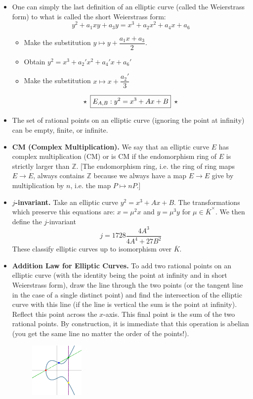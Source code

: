 \documentclass[11pt,letterpaper]{article}
\begin{document}
\begin{itemize}
\item One can simply the last definition of an elliptic curve (called the Weierstrass form) to what is called the short Weierstrass form:
	\[
	y^2 + a_1 xy + a_3y = x^3 + a_2 x^2 + a_4 x + a_6
	\]  
	\begin{itemize}
	\item Make the substitution $y \mapsto y + \dfrac{a_1 x+a_3}{2}$.
	\item Obtain $y^2= x^3+ a_2' x^2 + a_4' x + a_6'$
	\item Make the substitution $x \mapsto x + \dfrac{a_2'}{3}$
	\end{itemize}  
	\[
	\star \enskip \boxed{E_{A,B}: y^2 = x^3 + Ax + B} \enskip \star
	\]

\item The set of rational points on an elliptic curve (ignoring the point at infinity) can be empty, finite, or infinite. 

\item {\bfseries CM (Complex Multiplication).} We say that an elliptic curve $E$ has complex multiplication (CM) or is CM if the endomorphism ring of $E$ is strictly larger than $\mathbb{Z}$. [The endomorphism ring, i.e. the ring of ring maps $E \to E$, always contains $\mathbb{Z}$ because we always have a map $E \to E$ give by multiplication by $n$, i.e. the map $P \mapsto nP$.]

\item {\bfseries $j$-invariant.} Take an elliptic curve $y^2= x^3 + Ax + B$. The transformations which preserve this equations are: $x= \mu^2 x$ and $y= \mu^3 y$ for $\mu \in \overline{K}^\times$. We then define the $j$-invariant
	\[
	j= 1728 \dfrac{4A^3}{4A^4 + 27B^2}
	\]
These classify elliptic curves up to isomorphism over $\overline{K}$.

\item {\bfseries Addition Law for Elliptic Curves.} To add two rational points on an elliptic curve (with the identity being the point at infinity and in short Weierstrass form), draw the line through the two points (or the tangent line in the case of a single distinct point) and find the intersection of the elliptic curve with this line (if the line is vertical the sum is the point at infinity). Reflect this point across the $x$-axis. This final point is the sum of the two rational points. By construction, it is immediate that this operation is abelian (you get the same line no matter the order of the points!). 
	\begin{figure}[h]
	\centering
	\includegraphics[width=0.25\textwidth]{../images/ec_add.eps}
	\end{figure}


\end{itemize}
\end{document}
